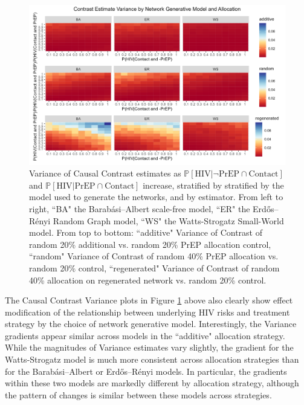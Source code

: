 \documentclass{article}
\theoremstyle{definition}
\begin{document}
\begin{figure}[H]
    \centering
    \includegraphics[width=\linewidth]{Figures/Generative Model Variance plots.png}
    \caption{Variance of Causal Contrast estimates as $\mathbb{P}\left[\text{HIV} \vert \neg \text{PrEP} \cap \text{Contact}\right]$ and $\mathbb{P}\left[\text{HIV} \vert \text{PrEP} \cap \text{Contact}\right]$ increase, stratified by stratified by the model used to generate the networks, and by estimator. From left to right, ``BA" the Barabási–Albert scale-free model, ``ER" the Erdős–Rényi Random Graph model, ``WS" the Watts-Strogatz Small-World model. From top to bottom: ``additive" Variance of Contrast of random 20\% additional vs. random 20\% PrEP allocation control, ``random" Variance of Contrast of random 40\% PrEP allocation vs. random 20\% control, ``regenerated" Variance of Contrast of random 40\% allocation on regenerated network vs. random 20\% control.}
    \label{fig:Figure S4.18}
\end{figure}
The Causal Contrast Variance plots in Figure \ref{fig:Figure S4.18} above also clearly show effect modification  of the relationship between underlying HIV risks and treatment strategy by the choice of network generative model.  Interestingly, the Variance gradients appear similar across models in the ``additive" allocation strategy. While the magnitudes of Variance estimates vary slightly, the gradient for the Watts-Strogatz model is much more consistent  across allocation strategies than for the Barabási–Albert or  Erdős–Rényi models. In particular, the gradients within these two models are markedly different by allocation strategy, although the pattern of changes is similar between these models across strategies. 
\end{document}
